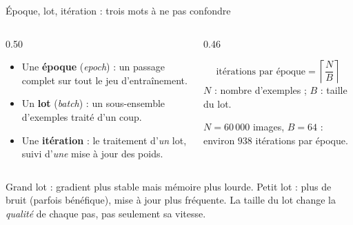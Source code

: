 \begin{frame}{Époque, lot, itération : trois mots à ne pas confondre}
\begin{columns}[t]
\begin{column}{0.50\textwidth}
\begin{itemize}
  \item Une \textbf{époque} (\emph{epoch}) : un passage complet sur tout le jeu
  d'entraînement.
  \item Un \textbf{lot} (\emph{batch}) : un sous-ensemble d'exemples traité
  d'un coup.
  \item Une \textbf{itération} : le traitement d'\emph{un} lot, suivi d'\emph{une}
  mise à jour des poids.
\end{itemize}
\end{column}
\begin{column}{0.46\textwidth}
\begin{kbox}
\[
\text{itérations par époque} = \left\lceil \frac{N}{B} \right\rceil
\]
$N$ : nombre d'exemples ; $B$ : taille du lot.
\end{kbox}
\begin{ebox}
$N = 60\,000$ images, $B = 64$ : environ $938$ itérations par époque.
\end{ebox}
\end{column}
\end{columns}
\vspace{1mm}
\begin{wbox}
Grand lot : gradient plus stable mais mémoire plus lourde. Petit lot : plus de
bruit (parfois bénéfique), mise à jour plus fréquente. La taille du lot change
la \emph{qualité} de chaque pas, pas seulement sa vitesse.
\end{wbox}
\end{frame}

